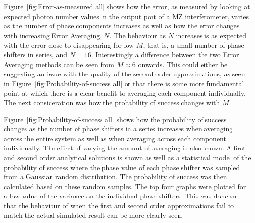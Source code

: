 \documentclass[aps,pra,twocolumn,superscriptaddress,numerical,floatfix]{revtex4-1}
\begin{document}
%
Figure~\ref{fig:Error-as-measured all} shows how the error, as measured by looking at expected photon number values in the output port of a MZ interferometer, varies as the number of phase components increases as well as how the error changes with increasing Error Averaging, $N$. The behaviour as $N$ increases is as expected with the error close to disappearing for low $M$, that is, a small number of phase shifters in series, and $N=16$. Interestingly a difference between the two Error Averaging methods can be seen from $M\approx6$ onwards. This could either be suggesting an issue with the quality of the second order approximations, as seen in Figure~\ref{fig:Probability-of-success all} or that there is some more fundamental point at which there is a clear benefit to averaging each component individually. The next consideration was how the probability of success changes with $M$.

Figure~\ref{fig:Probability-of-success all} shows how the probability of success changes as the number of phase shifters in a series increases when averaging across the entire system as well as when averaging across each component individually. The effect of varying the amount of averaging is also shown. A first and second order analytical solutions is shown as well as a statistical model of the probability of success where the phase value of each phase shifter was sampled from a Gaussian random distribution. The probability of success was then calculated based on these random samples. The top four graphs were plotted for a low value of the variance on the individual phase shifters. This was done so that the behaviour of when the first and second order approximations fail to match the actual simulated result can be more clearly seen. 
\end{document}
